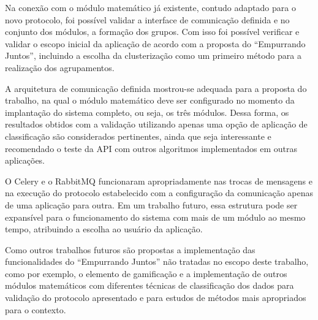   Na conexão com o módulo matemático já existente, contudo adaptado para o novo protocolo, foi possível validar a interface de 
  comunicação definida e no conjunto dos módulos, a formação dos grupos. Com isso foi possível verificar e validar o escopo 
  inicial da aplicação de acordo com a proposta do ``Empurrando Juntos'', incluindo a escolha da clusterização 
  como um primeiro método para a realização dos agrupamentos. 
  
  A arquitetura de comunicação definida mostrou-se adequada para a proposta do trabalho, na qual o módulo matemático 
  deve ser configurado no momento da implantação do sistema completo, ou seja, os três módulos. Dessa forma, os resultados obtidos
  com a validação utilizando apenas uma opção de aplicação de classificação são considerados pertinentes, ainda que seja interessante e recomendado
  o teste da API com outros algoritmos implementados em outras aplicações.
  
  O Celery e o RabbitMQ funcionaram apropriadamente nas trocas de mensagens e na execução do protocolo estabelecido com a configuração
  da comunicação apenas de uma aplicação para outra. Em um trabalho futuro, essa estrutura pode ser expansível para o funcionamento do sistema com mais 
  de um módulo ao mesmo tempo, atribuindo a escolha ao usuário da aplicação.
  
  Como outros trabalhos futuros são propostas a implementação das funcionalidades do ``Empurrando Juntos'' não tratadas no escopo deste trabalho,
  como por exemplo, o elemento de gamificação e a implementação de outros módulos matemáticos com diferentes técnicas
  de classificação dos dados para validação do protocolo apresentado e para estudos de métodos mais apropriados para o contexto.
  